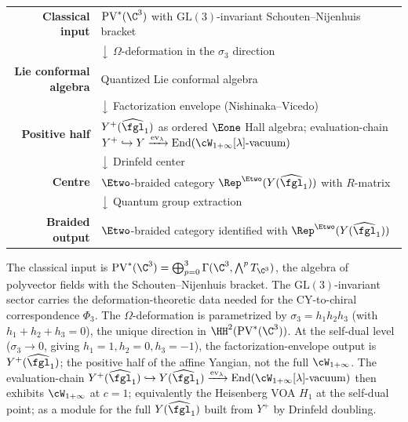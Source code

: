 \begin{center}
\renewcommand{\arraystretch}{1.3}
\begin{tabular}{rl}
\textbf{Classical input} & $\mathrm{PV}^*(\C^3)$ with $\mathrm{GL}(3)$-invariant Schouten--Nijenhuis bracket \\[3pt]
& $\big\downarrow$ \quad $\Omega$-deformation in the $\sigma_3$ direction \\[3pt]
\textbf{Lie conformal algebra} & Quantized Lie conformal algebra \\[3pt]
& $\big\downarrow$ \quad Factorization envelope (Nishinaka--Vicedo) \\[3pt]
\textbf{Positive half} & $Y^+(\widehat{\fgl}_1)$ as ordered $\Eone$ Hall algebra; evaluation-chain $Y^+ \hookrightarrow Y \xrightarrow{\mathrm{ev}_\lambda} \mathrm{End}(\cW_{1+\infty}[\lambda]\text{-vacuum})$ \\[3pt]
& $\big\downarrow$ \quad Drinfeld center \\[3pt]
\textbf{Centre} & $\Etwo$-braided category $\Rep^{\Etwo}(Y(\widehat{\fgl}_1))$ with $R$-matrix \\[3pt]
& $\big\downarrow$ \quad Quantum group extraction \\[3pt]
\textbf{Braided output} & $\Etwo$-braided category identified with $\Rep^{\Etwo}(Y(\widehat{\fgl}_1))$ \\
\end{tabular}
\end{center}

The classical input is $\mathrm{PV}^*(\C^3) = \bigoplus_{p=0}^{3} \Gamma(\C^3, \bigwedge^p T_{\C^3})$, the algebra of polyvector fields with the Schouten--Nijenhuis bracket. The $\mathrm{GL}(3)$-invariant sector carries the deformation-theoretic data needed for the CY-to-chiral correspondence $\Phi_3$. The $\Omega$-deformation is parametrized by $\sigma_3 = h_1 h_2 h_3$ (with $h_1 + h_2 + h_3 = 0$), the unique direction in $\HH^2(\mathrm{PV}^*(\C^3))$. At the self-dual level ($\sigma_3 \to 0$, giving $h_1 = 1, h_2 = 0, h_3 = -1$), the factorization-envelope output is $Y^+(\widehat{\fgl}_1)$; the positive half of the affine Yangian, not the full $\cW_{1+\infty}$. The evaluation-chain $Y^+(\widehat{\fgl}_1) \hookrightarrow Y(\widehat{\fgl}_1) \xrightarrow{\mathrm{ev}_\lambda} \mathrm{End}(\cW_{1+\infty}[\lambda]\text{-vacuum})$ then exhibits $\cW_{1+\infty}$ at $c = 1$; equivalently the Heisenberg VOA $H_1$ at the self-dual point; as a module for the full $Y(\widehat{\fgl}_1)$ built from $Y^+$ by Drinfeld doubling.

